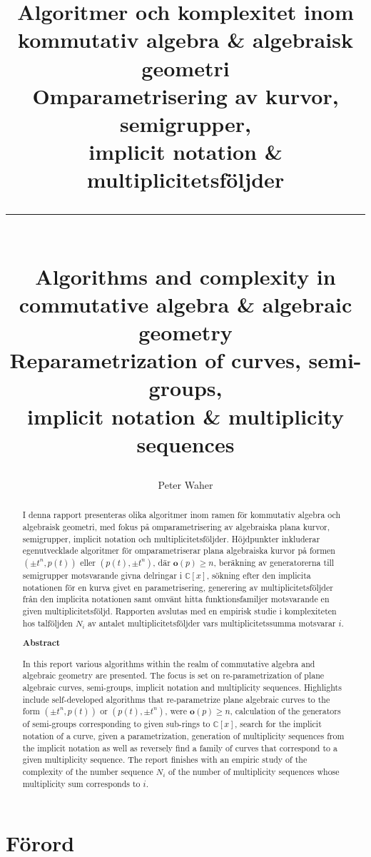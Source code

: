 \documentclass[twoside]{report}
\title{Algoritmer och komplexitet inom \\
	kommutativ algebra \& algebraisk geometri \\[20pt]
	\large Omparametrisering av kurvor, semigrupper, \\
	implicit notation \& multiplicitetsföljder\\[15pt]
	\hrule 
	\quad\\[15pt]
	\Large Algorithms and complexity in\\
	commutative algebra \& algebraic geometry \\[20pt]
	\large Reparametrization of curves, semi-groups, \\
	implicit notation \& multiplicity sequences\\[20pt]}
\author{Peter Waher}
\begin{document}
\maketitle

\begin{abstract}
I denna rapport presenteras olika algoritmer inom ramen för kommutativ algebra och algebraisk geometri, med fokus på omparametrisering av algebraiska plana kurvor, semigrupper, implicit notation och multiplicitetsföljder. Höjdpunkter inkluderar egenutvecklade algoritmer för omparametriserar plana algebraiska kurvor på formen $(\pm t^n, p(t))$ eller $(p(t), \pm t^n)$, där $\mathbf{o}(p)\geq n$, beräkning av generatorerna till semigrupper motsvarande givna delringar i $\mathbb{C}[x]$, sökning efter den implicita notationen för en kurva givet en parametrisering, generering av multiplicitetsföljder från den implicita notationen samt omvänt hitta funktionsfamiljer motsvarande en given multiplicitetsföljd. Rapporten avslutas med en empirisk studie i komplexiteten hos talföljden $N_i$ av antalet multiplicitetsföljder vars multiplicitetssumma motsvarar $i$. 

\begin{center}
	\textbf{Abstract}
\end{center}

In this report various algorithms within the realm of commutative algebra and algebraic geometry are presented. The focus is set on re-parametrization of plane algebraic curves, semi-groups, implicit notation and multiplicity sequences. Highlights include self-developed algorithms that re-parametrize plane algebraic curves to the form $(\pm t^n, p(t))$ or $(p(t), \pm t^n)$, were $\mathbf{o}(p)\geq n$, calculation of the generators of semi-groups corresponding to given sub-rings to $\mathbb{C}[x]$, search for the implicit notation of a curve, given a parametrization, generation of multiplicity sequences from the implicit notation as well as reversely find a family of curves that correspond to a given multiplicity sequence. The report finishes with an empiric study of the complexity of the number sequence $N_i$ of the number of multiplicity sequences whose multiplicity sum corresponds to $i$.
\end{abstract}

\section*{Förord}
\end{document}
